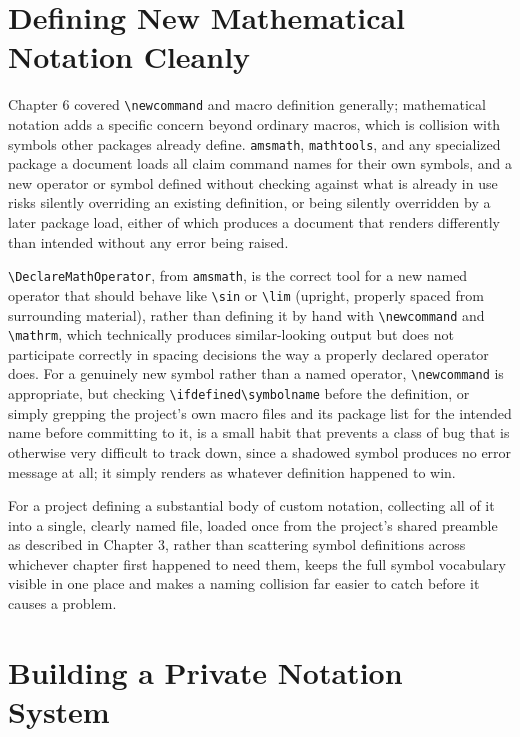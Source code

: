 \hypertarget{defining-new-mathematical-notation-cleanly}{%
\section{Defining New Mathematical Notation Cleanly}\label{defining-new-mathematical-notation-cleanly}}

Chapter 6 covered \texttt{\textbackslash{}newcommand} and macro definition generally; mathematical notation adds a specific concern beyond ordinary macros, which is collision with symbols other packages already define. \texttt{amsmath}, \texttt{mathtools}, and any specialized package a document loads all claim command names for their own symbols, and a new operator or symbol defined without checking against what is already in use risks silently overriding an existing definition, or being silently overridden by a later package load, either of which produces a document that renders differently than intended without any error being raised.

\texttt{\textbackslash{}DeclareMathOperator}, from \texttt{amsmath}, is the correct tool for a new named operator that should behave like \texttt{\textbackslash{}sin} or \texttt{\textbackslash{}lim} (upright, properly spaced from surrounding material), rather than defining it by hand with \texttt{\textbackslash{}newcommand} and \texttt{\textbackslash{}mathrm}, which technically produces similar-looking output but does not participate correctly in spacing decisions the way a properly declared operator does. For a genuinely new symbol rather than a named operator, \texttt{\textbackslash{}newcommand} is appropriate, but checking \texttt{\textbackslash{}ifdefined\textbackslash{}symbolname} before the definition, or simply grepping the project's own macro files and its package list for the intended name before committing to it, is a small habit that prevents a class of bug that is otherwise very difficult to track down, since a shadowed symbol produces no error message at all; it simply renders as whatever definition happened to win.

For a project defining a substantial body of custom notation, collecting all of it into a single, clearly named file, loaded once from the project's shared preamble as described in Chapter 3, rather than scattering symbol definitions across whichever chapter first happened to need them, keeps the full symbol vocabulary visible in one place and makes a naming collision far easier to catch before it causes a problem.

\hypertarget{building-a-private-notation-system}{%
\section{Building a Private Notation System}\label{building-a-private-notation-system}}

